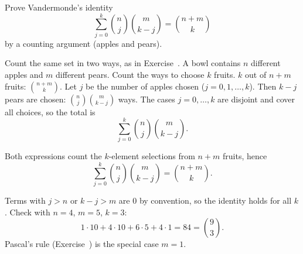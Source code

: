 
\begin{problem}
	Prove Vandermonde's identity
	\[ \sum_{j=0}^k\binom nj\binom m{k-j}=\binom{n+m}k \]
	by a counting argument (apples and pears).
\end{problem}

\begin{solution}
	\idea Count the same set in two ways, as in Exercise~.
	 A bowl contains $n$ different apples and $m$ different
	pears. Count the ways to choose $k$ fruits.
	 $k$ out of $n+m$ fruits: $\binom{n+m}k$.
	 Let $j$ be the number of apples chosen
	($j=0,1,\dots,k$). Then $k-j$ pears are chosen: $\binom nj\binom m{k-j}$
	ways. The cases $j=0,\dots,k$ are disjoint and cover all choices, so the
	total is
	\[ \sum_{j=0}^k\binom nj\binom m{k-j}. \]
	\begin{answer}
		Both expressions count the $k$-element selections from $n+m$ fruits,
		hence
		\[ \sum_{j=0}^k\binom nj\binom m{k-j}=\binom{n+m}k. \]
	\end{answer}
	\begin{remark}
		Terms with $j>n$ or $k-j>m$ are $0$ by convention, so the identity holds
		for all $k$. Check with $n=4$, $m=5$, $k=3$:
		\[ 1\cdot10+4\cdot10+6\cdot5+4\cdot1=84=\binom93. \]
		Pascal's rule (Exercise~) is the special case $m=1$.
	\end{remark}
\end{solution}

